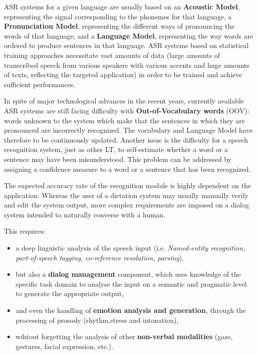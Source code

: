 \documentclass[]{../metanetpaper}
\begin{document}
\begin{multicols}{2}
ASR systems for a given language are usually based on an {\bf Acoustic
Model}, representing the signal corresponding to the phonemes for that
language, a {\bf Pronunciation Model}, representing the different ways of
pronouncing the words of that language, and a {\bf Language Model},
representing the way words are ordered to produce sentences in that
language. ASR systems based on statistical training approaches
necessitate vast amounts of data (large amounts of transcribed speech
from various speakers with various accents and huge amounts of texts,
reflecting the targeted application) in order to be trained and
achieve sufficient performances.

In spite of major technological advances in the recent years,
currently available ASR systems are still facing difficulty with
{\bf Out-of-Vocabulary words} (OOV): words unknown to the system which make
that the sentences in which they are pronounced are incorrectly
recognized. The vocabulary and Language Model have therefore to be
continuously updated. Another issue is the difficulty for a speech
recognition system, just as other LT, to self-estimate whether a word
or a sentence may have been misunderstood. This problem can be
addressed by assigning a confidence measure to a word or a sentence
that has been recognized.

The expected accuracy rate of the recognition module is highly
dependent on the application. Whereas the user of a dictation system
may usually manually verify and edit the system output, more complex
requirements are imposed on a dialog system intended to naturally
converse with a human. 

This requires:
\begin{itemize} 
\item a deep linguistic analysis of the speech input (i.e. {\em
  Named-entity recognition, part-of-speech tagging, co-reference
  resolution, parsing}),
\item but also a {\bf dialog management} component, which uses
  knowledge of the specific task domain to analyse the input on a
  semantic and pragmatic level to generate the appropriate output,
\item and even the handling of {\bf emotion analysis and generation},
  through the processing of prosody (rhythm,stress and intonation),
\item wihtout forgetting the analysis of other {\bf non-verbal
  modalities} (gaze, gestures, facial expression, etc.).
\end{itemize}


\end{multicols}
\end{document}
